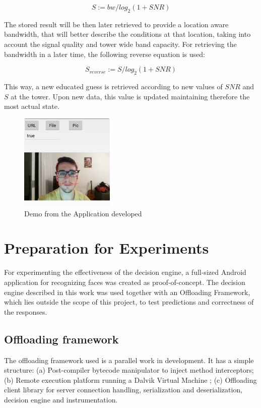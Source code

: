 \documentclass[10pt, conference, letterpaper]{IEEEtran}
\begin{document}
  \begin{equation} \label{eq:shannonbw}
    S := bw / log_2(1 + SNR)
  \end{equation}

  The stored result will be then later retrieved to provide a location aware bandwidth, that will better describe the conditions at that location, taking into account the signal quality and tower wide band capacity. For retrieving the bandwidth in a later time, the following reverse equation is used:

  \begin{equation} \label{eq:shannonbw_reverse}
    S_{reverse} := S / log_2(1 + SNR)
  \end{equation}

  This way, a new educated guess is retrieved according to new values of $SNR$ and $S$ at the tower. Upon new data, this value is updated maintaining therefore the most actual state.

\begin{figure}[!t]
  \centering
  \includegraphics[width=0.4\textwidth]{imgs/app.png}
  \caption{Demo from the Application developed}
  \label{fig:exectime}
\end{figure}

  \section{Preparation for Experiments}
  For experimenting the effectiveness of the decision engine, a full-sized Android application for recognizing faces was created as proof-of-concept. The decision engine described in this work was used together with an Offloading Framework, which lies outside the scope of this project, to test predictions and correctness of the responses.

  \subsection{Offloading framework}
  The offloading framework used is a parallel work in development. It has a simple structure: (a) Post-compiler bytecode manipulator to inject method interceptors; (b) Remote execution platform running a Dalvik Virtual Machine \cite{ehringer2010dalvik}; (c) Offloading client library for server connection handling, serialization and deserialization, decision engine and instrumentation.
\end{document}
